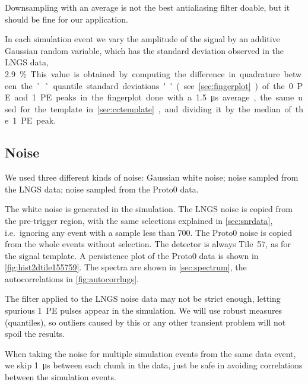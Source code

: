 Downsampling with an average is not the best antialiasing filter doable, but it
should be fine for our application.

In each simulation event we vary the amplitude of the signal by an additive
Gaussian random variable, which has the standard deviation observed in the LNGS
data, \SI{2.9}\%. This value is obtained by computing the difference in
quadrature between the ``quantile standard deviations'' (see
\autoref{sec:fingerplot}) of the \SI{0}{PE} and \SI{1}{PE} peaks in the
fingerplot done with a \SI{1.5}{\micro s} average, the same used for the
template in \autoref{sec:cctemplate}, and dividing it by the median of the
\SI{1}{PE} peak.

\begin{figure}
    


\end{figure}

\subsection{Noise}

We used three different kinds of noise: Gaussian white noise; noise sampled
from the LNGS data; noise sampled from the Proto0 data.

The white noise is generated in the simulation. The LNGS noise is copied from
the pre-trigger region, with the same selections explained in
\autoref{sec:snrdata}, i.e.\ ignoring any event with a sample less than 700.
The Proto0 noise is copied from the whole events without selection. The
detector is always Tile~57, as for the signal template. A persistence plot of
the Proto0 data is shown in \autoref{fig:hist2dtile155759}. The spectra are
shown in \autoref{sec:spectrum}, the autocorrelations in
\autoref{fig:autocorrlngs}.

The filter applied to the LNGS noise data may not be strict enough, letting
spurious \SI{1}{PE} pulses appear in the simulation. We will use robust
measures (quantiles), so outliers caused by this or any other transient problem
will not spoil the results.

When taking the noise for multiple simulation events from the same data event,
we skip \SI{1}{\micro s} between each chunk in the data, just be safe in
avoiding correlations between the simulation events.

